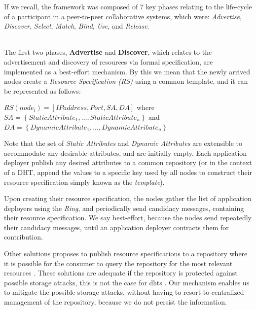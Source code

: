 \documentclass[12pt, titlepage]{uo_temp}
\begin{document}
     If we recall, the framework was composed of 7 key phases relating to the life-cycle
     of a participant in a peer-to-peer collaborative systems, which were:
     \emph{Advertise}, \emph{Discover}, \emph{Select}, \emph{Match}, \emph{Bind},
     \emph{Use}, and \emph{Release}. 
     
     \\ The first two phases, \textbf{Advertise} and \textbf{Discover}, which relates to
     the advertisement and discovery of resources via formal specification, are
     implemented as a best-effort mechanism. By this we mean that the newly arrived nodes
     create a \emph{Resource Specification (RS)} using a common template, and it can be
     represented as follows:
     
     
     \begin{center}
     $RS(node_i) = [IPaddress, Port, SA, DA]$ where \\
     $SA = \left\{{StaticAttribute_1, ..., StaticAttribute_n}\right\}$ and \\
     $DA = \left\{{DynamicAttribute_1, ..., DynamicAttribute_n}\right\}$
     \end{center}
     
     Note that the set of \emph{Static Attributes} and \emph{Dynamic Attributes} are
     extensible to accommodate any desirable attributes, and are initially empty. Each
     application deployer publish any desired attributes to a common repository (or
     in the context of a DHT, append the values to a specific key used by all nodes to
     construct their resource specification simply known as the \emph{template}).
     
     Upon creating their resource specification, the nodes gather the list of application
     deployers using the \emph{Ring}, and periodically send candidacy messages, containing
     their resource specification. We say best-effort, because the nodes send repeatedly
     their candidacy messages, until an application deployer contracts them for contribution.
     
     Other solutions proposes to publish resource specifications to a repository where it
     is possible for the consumer to query the repository for the most relevant resources
     \cite{p2p_collab}. These solutions are adequate if the repository is protected
     against possible storage attacks, this is not the case for \gls{dht}s
     \cite{urdaneta2011survey}. Our mechanism enables us to mitigate the possible storage
     attacks, without having to resort to centralized management of the repository,
     because we do not persist the information. 
\end{document}
